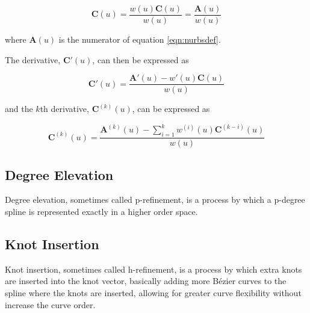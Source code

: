 \begin{equation} \textbf{C}(u) = \frac{ w(u) \textbf{C}(u) }{ w(u) } = \frac{ \textbf{A}(u) }{ w(u) }   \end{equation}  

where $\textbf{A}(u) $ is the numerator of equation \ref{eqn:nurbsdef}.

The derivative, $\textbf{C}'(u)$, can then be expressed as

\begin{equation} \textbf{C}'(u) = \frac{ \textbf{A}'(u) - w'(u) \textbf{C}(u) }{ w(u) }   \end{equation}

and the $k$th derivative, $\textbf{C}^{ (k) }  (u)$, can be expressed as

\begin{equation} \textbf{C}^{(k)}(u) = \frac{ \textbf{A}^{(k)}(u) - \displaystyle \sum^k_{i=1} w^{(i)} (u) \textbf{C}^{(k-i)} (u) }{ w(u) }   \end{equation}

\subsection{Degree Elevation}
Degree elevation, sometimes called p-refinement, is a process by which a p-degree spline is represented exactly in a higher order space.


\subsection{Knot Insertion}
Knot insertion, sometimes called h-refinement, is a process by which extra knots are inserted into the knot vector, basically adding more Bézier curves to the spline where the knots are inserted, allowing for greater curve flexibility without increase the curve order.



%
%  

 
